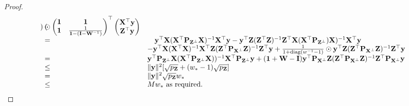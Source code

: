 \documentclass{amsart}[12pt]
\begin{document}
\begin{proof}
\begin{equation*}
\begin{array}{ll}
\begin{pmatrix}
			\end{pmatrix}
			\odot
			\begin{pmatrix}
			{\bf1}                                                                  & {\bf 1}                                                                                                                                                                                                   \\
			{\bf 1}                                                                  & \frac{1}{{\bf 1} - ({\bf I} - {\bf W}^{-1})}                                                                                                                                                                      
			\end{pmatrix}
			^\top
			\begin{pmatrix}
			{\bf X}^\top {\bf y} \\
			{\bf Z}^\top {\bf y}
			\end{pmatrix} \\
			=                                                                      & \quad{\bf y}^\top {\bf X} ({\bf X}^\top {\bf P}_{{\bf Z}^\perp} {\bf X})^{-1} {\bf X}^\top {\bf y} - {\bf y}^\top {\bf Z}({\bf Z}^\top {\bf Z})^{-1} {\bf Z}^\top {\bf X} ({\bf X}^\top {\bf P}_{{\bf Z}^\perp}) {\bf X})^{-1} {\bf X}^\top {\bf y}                                     \\
			                                                                       & -{\bf y}^\top {\bf X} ({\bf X}^\top {\bf X})^{-1} {\bf X}^\top {\bf Z} ({\bf Z}^\top {\bf P}_{{\bf X}^\perp} {\bf Z})^{-1} {\bf Z}^\top {\bf y} + \frac{1}{1 + \text{diag}{(w^{-1} - 1)}} \odot {\bf y}^\top {\bf Z} ({\bf Z}^\top {\bf P}_{{\bf X}^\perp} {\bf Z})^{-1} {\bf Z}^\top {\bf y} \\
			=                                                                      & {\bf y}^\top {\bf P}_{{\bf Z}^\perp} {\bf X} ({\bf X}^\top {\bf P}_{{\bf Z}^\perp} {\bf X}))^{-1} {\bf X}^\top {\bf P}_{{\bf Z}^\perp} {\bf y}                                                                                                          
			+ ({\bf 1} + {\bf W} - {\bf I}) {\bf y}^\top {\bf P}_{{\bf X}^\perp} {\bf Z} ({\bf Z}^\top {\bf P}_{{\bf X}^\perp} {\bf Z})^{-1} {\bf Z}^\top {\bf P}_{{\bf X}^\perp} {\bf y} \\
			\leq                                                                   & \| {\bf y} \|^2 [\sqrt{p_{\bf Z}} + (w_* - 1) \sqrt{p_{\bf Z}}]                                                                                                                                                     \\
			=                                                                      & \| {\bf y} \|^2 \sqrt{p_{\bf Z}} w_*                                                                                                                                                                            \\
			\leq                                                                   & M w_* \text{ as required}.                                                                                                                                                                              
		\end{array}
	\end{equation*}
		 
\end{proof}
\end{document}
